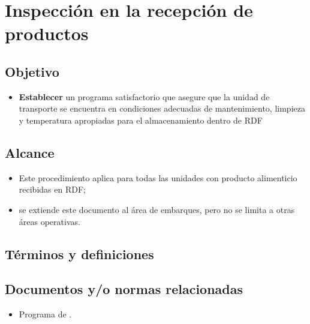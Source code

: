 \thispagestyle{formato-PI}
\renewcommand{\MayorVer}{2}
\renewcommand{\MenorVer}{0}
\renewcommand{\FechaPub}{2023--01}
\renewcommand{\TipoID}{PRO}
\renewcommand{\Titulo}{Inspección en la recepción de productos}

\section{\Titulo}
\renewcommand{\Codigo}{\Prog--\thesection--\TipoID}

\subsection{Objetivo}
\begin{itemize}
	\item \textbf{Establecer} un programa satisfactorio que asegure que la unidad de transporte se encuentra en condiciones adecuadas de mantenimiento, limpieza y temperatura apropiadas para el almacenamiento dentro de \gls{RDF}
\end{itemize}

\subsection{Alcance}
\begin{itemize}
	\item Este procedimiento aplica para todas las unidades con producto alimenticio recibidas en RDF;
	\item se extiende este documento al área de embarques, pero no se limita a otras áreas operativas.
\end{itemize}

\subsection{Términos y definiciones}


\begin{description}
\end{description}

\subsection{Documentos y/o normas relacionadas}
\begin{itemize}
	\item Programa de .
\end{itemize}

